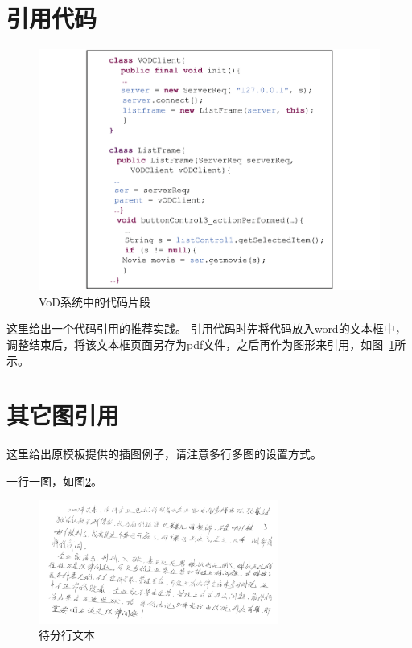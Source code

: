 \section{引用代码}

\begin{figure}[htb]
  \centering
  \includegraphics[width=\linewidth]{figure/chapter4/VoDCodeSample.pdf}
  \caption{VoD系统中的代码片段}\label{fig_VoDCodeSample}
\end{figure}

这里给出一个代码引用的推荐实践。
引用代码时先将代码放入word的文本框中，调整结束后，将该文本框页面另存为pdf文件，之后再作为图形来引用，如图~\ref{fig_VoDCodeSample}所示。

\section{其它图引用}

这里给出原模板提供的插图例子，请注意多行多图的设置方式。

一行一图，如图\ref{fig:line}。
\begin{figure}[htbp]
	\centering
	\includegraphics[width=0.7\textwidth]{figure/line.png} %
	\caption{待分行文本}
	\label{fig:line}
\end{figure}


